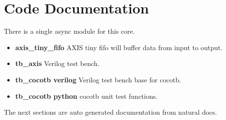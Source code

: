 \newpage

\section{Code Documentation} \label{Code Documentation}

\par
There is a single async module for this core.

\begin{itemize}
\item \textbf{axis\_tiny\_fifo} AXIS tiny fifo will buffer data from input to output.\\
\item \textbf{tb\_axis} Verilog test bench.\\
\item \textbf{tb\_cocotb verilog} Verilog test bench base for cocotb.\\
\item \textbf{tb\_cocotb python} cocotb unit test functions.\\
\end{itemize}
The next sections are auto generated documentation from natural docs.

